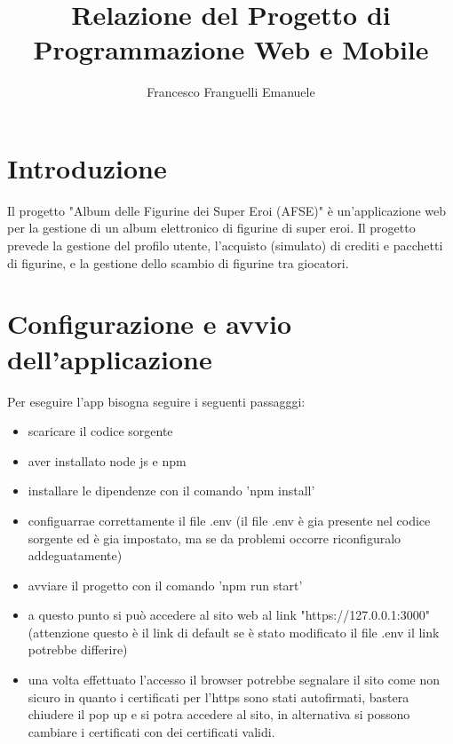 \documentclass{article}
\title{Relazione del Progetto di Programmazione Web e Mobile}
\author{Francesco Franguelli Emanuele}
\begin{document}
\maketitle

\section*{Introduzione}
Il progetto "Album delle Figurine dei Super Eroi (AFSE)" è un'applicazione web per la gestione di un album elettronico di figurine di super eroi. Il progetto prevede la gestione del profilo utente, l'acquisto (simulato) di crediti e pacchetti di figurine, e la gestione dello scambio di figurine tra giocatori.

\section{Configurazione e avvio dell'applicazione}
    Per eseguire l'app bisogna seguire i seguenti passagggi:
    \begin{itemize}
        \item scaricare il codice sorgente
        \item aver installato node js e npm
        \item installare le dipendenze con il comando 'npm install'
        \item configuarrae correttamente il file .env (il file .env è gia presente nel codice sorgente ed è gia impostato, ma se da problemi occorre riconfiguralo addeguatamente)
        \item avviare il progetto con il comando 'npm run start'
        \item a questo punto si può accedere al sito web al link "https://127.0.0.1:3000" (attenzione questo è il link di default se è stato modificato il file .env il link potrebbe differire)
        \item una volta effettuato l'accesso il browser potrebbe segnalare il sito come non sicuro in quanto i certificati per l'https sono stati autofirmati, bastera chiudere il pop up e si potra accedere al sito, in alternativa si possono cambiare i certificati con dei certificati validi.
    \end{itemize}
\end{document}
